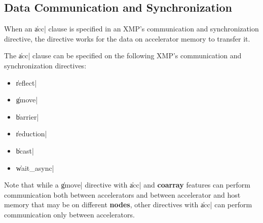 \subsection{Data Communication and Synchronization}




When an \|acc| clause is specified in an XMP's communication
and synchronization directive, the directive works for the data on 
accelerator memory to transfer it.

The \|acc| clause can be specified on the following XMP's communication
and synchronization directives:

\begin{itemize}
  \item \|reflect|
  \item \|gmove|
  \item \|barrier|
  \item \|reduction|
  \item \|bcast|
  \item \|wait_async|
\end{itemize}

Note that while a \|gmove| directive with \|acc| 
and {\bf coarray} features can perform communication both between
accelerators and between 
accelerator and host memory that may be on different {\bf nodes},
%
other directives with \|acc| can perform communication only between
accelerators.







